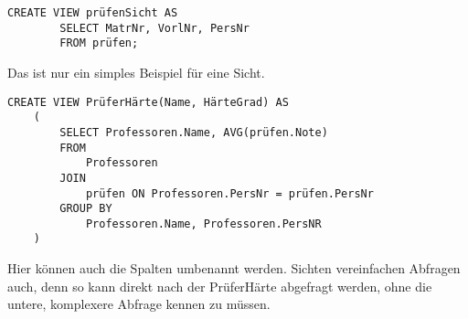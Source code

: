 \begin{lstlisting}[caption={create view SQL}]
    CREATE VIEW prüfenSicht AS 
        SELECT MatrNr, VorlNr, PersNr
        FROM prüfen;
\end{lstlisting}

Das ist nur ein simples Beispiel für eine Sicht.

\begin{lstlisting}[caption={Komplexere Sicht}]
    CREATE VIEW PrüferHärte(Name, HärteGrad) AS 
    (   
        SELECT Professoren.Name, AVG(prüfen.Note)
        FROM
            Professoren
        JOIN
            prüfen ON Professoren.PersNr = prüfen.PersNr
        GROUP BY 
            Professoren.Name, Professoren.PersNR
    )
\end{lstlisting}
Hier können auch die Spalten umbenannt werden. Sichten vereinfachen Abfragen auch, denn so kann direkt nach der PrüferHärte abgefragt werden, ohne die untere, komplexere Abfrage kennen zu müssen.

